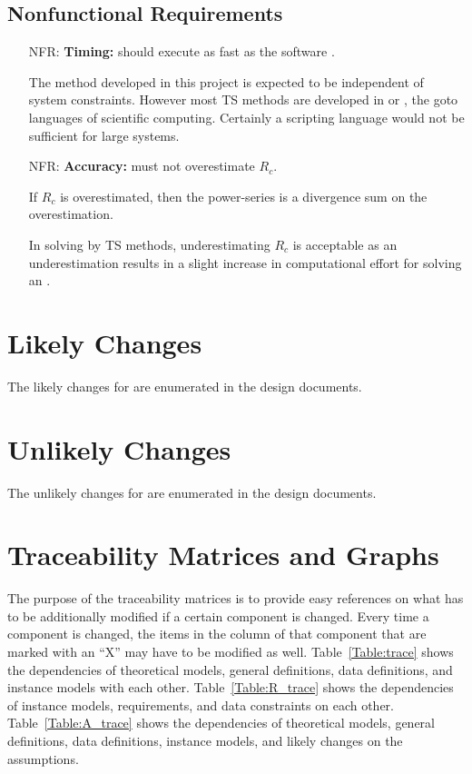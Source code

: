 \documentclass[12pt]{article}
\newcounter{nfrnum} %
\begin{document}
\subsection{Nonfunctional Requirements}

\noindent \begin{itemize}
  \item[NFR\refstepcounter{nfrnum}\thenfrnum \label{NFR_timing}:]\textbf{Timing:} 
     should execute as fast as the \cite{chang1982} software \rdcon.

    The method developed in this
    project is expected to be independent of system constraints. However
    most TS methods are developed in \cpp or \fortran, the goto languages
    of scientific computing. Certainly a scripting language would not be
    sufficient for large systems.

  \item[NFR\refstepcounter{nfrnum}\thenfrnum \label{NFR_accuracy}:]\textbf{Accuracy:}
     must not overestimate $R_c$.
    
    If $R_c$ is overestimated, then the power-series is a divergence sum on the overestimation.
  
    In \ode solving by TS methods, underestimating $R_c$ is acceptable as an underestimation
    results in a slight increase in computational effort for solving an \ode \ivp.
\end{itemize}

\section{Likely Changes}    

The likely changes for  are enumerated in the design documents.

\section{Unlikely Changes} 

The unlikely changes for  are enumerated in the design documents.

\section{Traceability Matrices and Graphs}

The purpose of the traceability matrices is to provide easy references on what
has to be additionally modified if a certain component is changed.  Every time a
component is changed, the items in the column of that component that are marked
with an ``X'' may have to be modified as well.  Table~\ref{Table:trace} shows the
dependencies of theoretical models, general definitions, data definitions, and
instance models with each other. Table~\ref{Table:R_trace} shows the
dependencies of instance models, requirements, and data constraints on each
other. Table~\ref{Table:A_trace} shows the dependencies of theoretical models,
general definitions, data definitions, instance models, and likely changes on
the assumptions.
\end{document}
